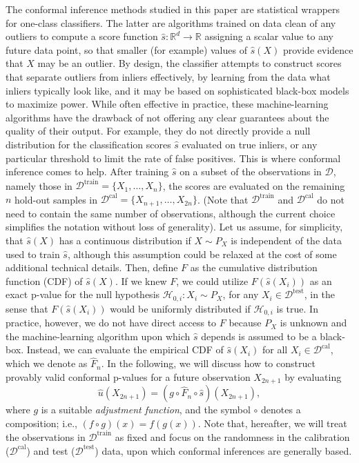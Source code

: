 \documentclass[11pt]{article}
\begin{document}
The conformal inference methods studied in this paper are statistical wrappers for one-class classifiers. The latter are algorithms trained on data clean of any outliers to compute a score function $\hat{s} : \mathbb{R}^d \to \mathbb{R}$ assigning a scalar value to any future data point, so that smaller (for example) values of $\hat{s}(X)$ provide evidence that $X$ may be an outlier. By design, the classifier attempts to construct scores that separate outliers from inliers effectively, by learning from the data what inliers typically look like, and it may be based on sophisticated black-box models to maximize power. While often effective in practice, these machine-learning algorithms have the drawback of not offering any clear guarantees about the quality of their output. For example, they do not directly provide a null distribution for the classification scores $\hat{s}$ evaluated on true inliers, or any particular threshold to limit the rate of false positives. 
This is where conformal inference comes to help.
After training $\hat{s}$ on a subset of the observations in $\mathcal{D}$, namely those in $\mathcal{D}^{\text{train}} = \{X_1, \ldots, X_n\}$, the scores are evaluated on the remaining $n$ hold-out samples in $\mathcal{D}^{\text{cal}} = \{X_{n+1}, \ldots, X_{2n}\}$.
(Note that $\mathcal{D}^{\text{train}}$ and $\mathcal{D}^{\text{cal}}$ do not need to contain the same number of observations, although the current choice simplifies the notation without loss of generality).
Let us assume, for simplicity, that $\hat{s}(X)$ has a continuous distribution if $X \sim P_X$ is independent of the data used to train $\hat{s}$, although this assumption could be relaxed at the cost of some additional technical details.
Then, define $F$ as the cumulative distribution function (CDF) of $\hat{s}(X)$.
If we knew $F$, we could utilize $F(\hat{s}(X_i))$ as an exact p-value for the null hypothesis $\mathcal{H}_{0,i}: X_i \sim P_{X}$, for any $X_i \in \mathcal{D}^{\mathrm{test}}$, in the sense that $F(\hat{s}(X_i))$ would be uniformly distributed if $\mathcal{H}_{0,i}$ is true.
In practice, however, we do not have direct access to $F$ because $P_X$ is unknown and the machine-learning algorithm upon which $\hat{s}$ depends is assumed to be a black-box.
Instead, we can evaluate the empirical CDF of $\hat{s}(X_i)$ for all $X_i \in \mathcal{D}^{\text{cal}}$, which we denote as $\hat{F}_n$.
In the following, we will discuss how to construct provably valid conformal p-values for a future observation $X_{2n+1}$ by evaluating
\begin{equation} \label{eq:pval_form}
    \hat{u}(X_{2n+1}) = \left(g \circ \hat{F}_n \circ \hat{s} \right)(X_{2n+1}),
\end{equation}
where $g$ is a suitable \emph{adjustment function}, and the symbol $\circ$ denotes a composition; i.e., $(f \circ g)(x) = f(g(x))$.
Note that, hereafter, we will treat the observations in $\mathcal{D}^{\text{train}}$ as fixed and focus on the randomness in the calibration ($\mathcal{D}^{\text{cal}}$) and test ($\mathcal{D}^{\mathrm{test}}$) data, upon which conformal inferences are generally based.
\end{document}
